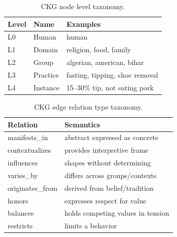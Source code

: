 \documentclass[11pt]{article}
\begin{document}
\begin{table}[h]
\centering
\small
\begin{tabular}{lll}
\toprule
\textbf{Level} & \textbf{Name} & \textbf{Examples} \\
\midrule
L0 & Human & human \\
L1 & Domain & religion, food, family \\
L2 & Group  & algerian, american, bihar \\
L3 & Practice & fasting, tipping, shoe removal \\
L4 & Instance & 15--30\% tip, not eating pork \\
\bottomrule
\end{tabular}
\caption{CKG node level taxonomy.}
\end{table}

\begin{table}[h]
\centering
\small
\begin{tabular}{ll}
\toprule
\textbf{Relation} & \textbf{Semantics} \\
\midrule
manifests\_in    & abstract expressed as concrete \\
contextualizes   & provides interpretive frame \\
influences       & shapes without determining \\
varies\_by       & differs across groups/contexts \\
originates\_from & derived from belief/tradition \\
honors           & expresses respect for value \\
balances         & holds competing values in tension \\
restricts        & limits a behavior \\
\bottomrule
\end{tabular}
\caption{CKG edge relation type taxonomy.}
\end{table}
\end{document}
